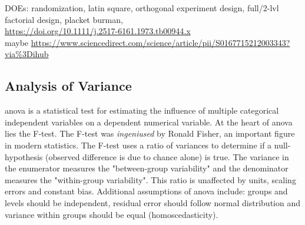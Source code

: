 DOEs: randomization, latin square, orthogonal experiment design, full/2-lvl factorial design, placket burman, \\
\url{https://doi.org/10.1111/j.2517-6161.1973.tb00944.x}\cite{whittle1973some}  \\
maybe \url{https://www.sciencedirect.com/science/article/pii/S0167715212003343?via\%3Dihub}
\fi

\subsection{Analysis of Variance} %
\Gls{anova} is a statistical test for estimating the influence of multiple categorical independent variables on a dependent numerical variable. 
At the heart of \gls{anova} lies the F-test. 
The F-test was \textit{ingeniused} by Ronald Fisher\cite{fisher1921on}, an important figure in modern statistics. 
The F-test uses a ratio of variances to determine if a null-hypothesis (observed difference is due to chance alone) is true. 
The variance in the enumerator measures the "between-group variability" and the denominator measures the "within-group variability".
This ratio is unaffected by units, scaling errors and constant bias. 
%
Additional assumptions of \gls{anova} include: groups and levels should be independent, 
residual error should follow normal distribution and variance within groups should be equal (homoscedasticity). 



